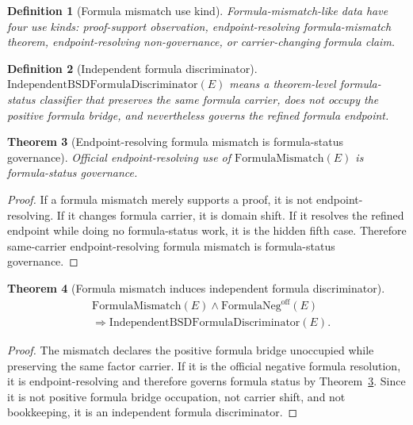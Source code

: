 \documentclass[11pt]{article}
\newtheorem{theorem}{Theorem}[section]
\newtheorem{definition}[theorem]{Definition}
\newcommand{\FormulaMismatch}{\mathrm{FormulaMismatch}}
\newcommand{\FormulaNeg}{\mathrm{FormulaNeg}^{\mathrm{off}}}
\begin{document}
\begin{definition}[Formula mismatch use kind]
Formula-mismatch-like data have four use kinds: proof-support observation, endpoint-resolving formula-mismatch theorem, endpoint-resolving non-governance, or carrier-changing formula claim.
\end{definition}

\begin{definition}[Independent formula discriminator]
$\mathrm{IndependentBSDFormulaDiscriminator}(E)$ means a theorem-level formula-status classifier that preserves the same formula carrier, does not occupy the positive formula bridge, and nevertheless governs the refined formula endpoint.
\end{definition}

\begin{theorem}[Endpoint-resolving formula mismatch is formula-status governance]\label{thm:formula-governance}
Official endpoint-resolving use of $\FormulaMismatch(E)$ is formula-status governance.
\end{theorem}

\begin{proof}
If a formula mismatch merely supports a proof, it is not endpoint-resolving. If it changes formula carrier, it is domain shift. If it resolves the refined endpoint while doing no formula-status work, it is the hidden fifth case. Therefore same-carrier endpoint-resolving formula mismatch is formula-status governance.
\end{proof}

\begin{theorem}[Formula mismatch induces independent formula discriminator]\label{thm:formula-disc}
\[
\begin{aligned}
&\FormulaMismatch(E)\wedge \FormulaNeg(E)\\
&\Rightarrow \mathrm{IndependentBSDFormulaDiscriminator}(E).
\end{aligned}
\]
\end{theorem}

\begin{proof}
The mismatch declares the positive formula bridge unoccupied while preserving the same factor carrier. If it is the official negative formula resolution, it is endpoint-resolving and therefore governs formula status by Theorem~\ref{thm:formula-governance}. Since it is not positive formula bridge occupation, not carrier shift, and not bookkeeping, it is an independent formula discriminator.
\end{proof}
\end{document}
